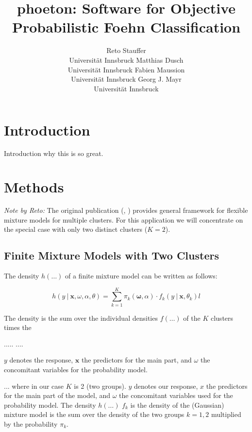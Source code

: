 \documentclass[article,nojss,shortnames]{jss}
\author{Reto Stauffer\\Universit\"at Innsbruck
\And Matthias Dusch\\Universit\"at Innsbruck
\AND Fabien Maussion\\Universit\"at Innsbruck
\And Georg J. Mayr\\Universit\"at Innsbruck}
\title{phoeton: Software for Objective Probabilistic Foehn Classification}
\begin{document}
\section{Introduction}

Introduction why this is so great.





\section{Methods}

\textit{Note by Reto:}
The original publication (, \citealt{gruen2008})
provides general framework for flexible mixture models for multiple
clusters. For this application we will concentrate on the special
case with only two distinct clusters ($K = 2$).

\subsection{Finite Mixture Models with Two Clusters}

The density $h(\dots)$ of a finite mixture model can be written as follows:

\begin{equation}
    h(\mathit{y} ~|~ \mathbf{x}, \mathit{\omega}, \mathit{\alpha}, \mathit{\theta}) =
        \sum_{k=1}^K \pi_k(\mathbf{\omega}, \mathit{\alpha}) \cdot f_k(\mathit{y} ~|~ \mathbf{x}, \mathit{\theta}_k)l
\end{equation}

The density is the sum over the individual densities $f(\dots)$ of the $K$ clusters
times the 


.....
....

$\mathit{y}$ denotes the response, $\mathbf{x}$ the predictors for the main part,
and $\mathit{\omega}$ the concomitant variables for the probability model.



... where in our case $K$ is 2 (two groups). $y$ denotes our response, $x$ the predictors
for the main part of the model, and $\omega$ the concomitant variables used for the
probability model.
The density $h(\dots)$
$f_k$ is the density of the (Gaussian) mixture model is the sum over the density
of the two groups $k=1,2$ multiplied by the probability $\pi_k$.
\end{document}
